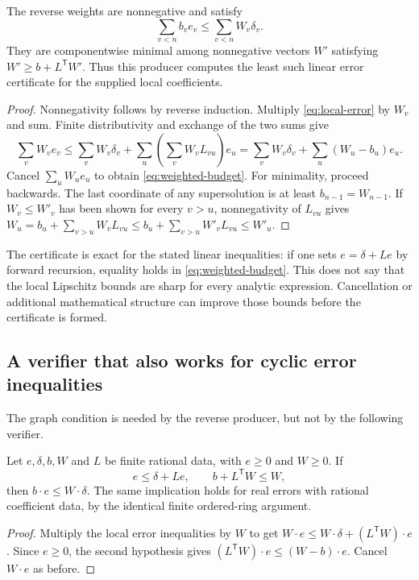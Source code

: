 \begin{theorem}\label{thm:reverse}
The reverse weights are nonnegative and satisfy
\begin{equation}\label{eq:weighted-budget}
 \sum_{v<n}b_ve_v\le\sum_{v<n}W_v\delta_v.
\end{equation}
They are componentwise minimal among nonnegative vectors $W'$ satisfying
$W'\ge b+L^{\mathsf T}W'$. Thus this producer computes the least such linear error certificate for the supplied local coefficients.
\end{theorem}
\begin{proof}
Nonnegativity follows by reverse induction. Multiply \eqref{eq:local-error} by $W_v$ and sum. Finite distributivity and exchange of the two sums give
\[
 \sum_vW_ve_v
 \le\sum_vW_v\delta_v+
     \sum_u\left(\sum_vW_vL_{vu}\right)e_u
 =\sum_vW_v\delta_v+\sum_u(W_u-b_u)e_u.
\]
Cancel $\sum_uW_ue_u$ to obtain \eqref{eq:weighted-budget}. For minimality, proceed backwards. The last coordinate of any supersolution is at least $b_{n-1}=W_{n-1}$. If $W_v\le W'_v$ has been shown for every $v>u$, nonnegativity of $L_{vu}$ gives
$W_u=b_u+\sum_{v>u}W_vL_{vu}\le b_u+\sum_{v>u}W'_vL_{vu}\le W'_u$.
\end{proof}

The certificate is exact for the stated linear inequalities: if one sets $e=\delta+Le$ by forward recursion, equality holds in \eqref{eq:weighted-budget}. This does not say that the local Lipschitz bounds are sharp for every analytic expression. Cancellation or additional mathematical structure can improve those bounds before the certificate is formed.

\subsection{A verifier that also works for cyclic error inequalities}

The graph condition is needed by the reverse producer, but not by the following verifier.

\begin{theorem}\label{thm:dual}
Let $e,\delta,b,W$ and $L$ be finite rational data, with $e\ge0$ and $W\ge0$. If
\[
 e\le\delta+Le,\qquad b+L^{\mathsf T}W\le W,
\]
then $b\cdot e\le W\cdot\delta$. The same implication holds for real errors with rational coefficient data, by the identical finite ordered-ring argument.
\end{theorem}
\begin{proof}
Multiply the local error inequalities by $W$ to get
$W\cdot e\le W\cdot\delta+(L^{\mathsf T}W)\cdot e$.
Since $e\ge0$, the second hypothesis gives
$(L^{\mathsf T}W)\cdot e\le(W-b)\cdot e$.
Cancel $W\cdot e$ as before.
\end{proof}

